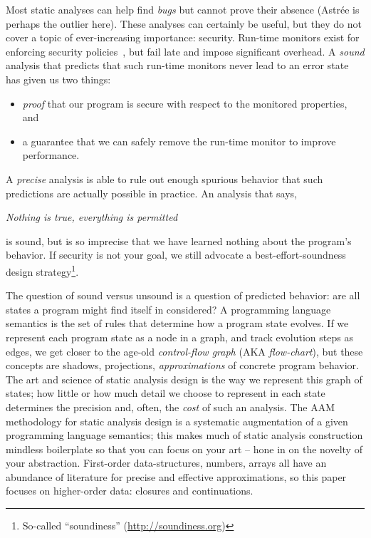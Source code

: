 Most static analyses can help find \emph{bugs} but cannot prove their absence (Astr\'ee is perhaps the outlier here).
%
These analyses can certainly be useful, but they do not cover a topic of ever-increasing importance: security.
%
Run-time monitors exist for enforcing security policies~\citep{ianjohnson:Erlingsson:2004:IRM:997617}, but fail late and impose significant overhead.
%
A \emph{sound} analysis that predicts that such run-time monitors never lead to an error state has given us two things:
\begin{itemize}
\item{\emph{proof} that our program is secure with respect to the monitored properties, and}
\item{a guarantee that we can safely remove the run-time monitor to improve performance.}
\end{itemize}
A \emph{precise} analysis is able to rule out enough spurious behavior that such predictions are actually possible in practice.
%
An analysis that says,
\begin{center}
  \textit{Nothing is true, everything is permitted}
\end{center}
is sound, but is so imprecise that we have learned nothing about the program's behavior. 
%
If security is not your goal, we still advocate a best-effort-soundness design strategy\footnote{So-called ``soundiness'' (\url{http://soundiness.org})}.

The question of sound versus unsound is a question of predicted behavior: are all states a program might find itself in considered?
%
A programming language semantics is the set of rules that determine how a program state evolves.
%
If we represent each program state as a node in a graph, and track evolution steps as edges, we get closer to the age-old \emph{control-flow graph} (AKA \emph{flow-chart}), but these concepts are shadows, projections, \emph{approximations} of concrete program behavior.
%
The art and science of static analysis design is the way we represent this graph of states; how little or how much detail we choose to represent in each state determines the precision and, often, the \emph{cost} of such an analysis.
%
The AAM methodology for static analysis design is a systematic augmentation of a given programming language semantics; this makes much of static analysis construction mindless boilerplate so that you can focus on your art -- hone in on the novelty of your abstraction.
%
First-order data-structures, numbers, arrays all have an abundance of literature for precise and effective approximations, so this paper focuses on higher-order data: closures and continuations.
%
